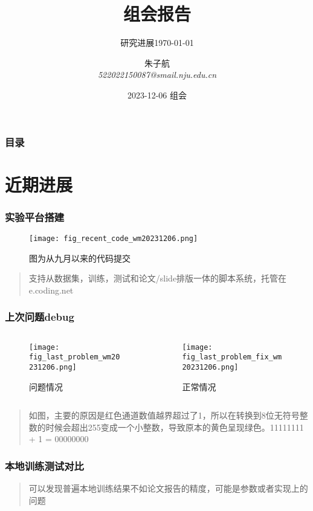 \documentclass{njupre/njupre}
\title[组会]{组会报告}
\subtitle{研究进展\today}
\author[朱子航]{\texorpdfstring{朱子航 \\ \smallskip \textit{522022150087@smail.nju.edu.cn}}{}}
\date[2023-12-06]{\texorpdfstring{2023-12-06 组会}{}}
\begin{document}
\begin{frame}
    \titlepage
\end{frame}
\begin{frame}
    \frametitle{目录}
    \tableofcontents
\end{frame}

\section{近期进展}

\begin{frame}
    \frametitle{实验平台搭建}
    \begin{figure}
        \texttt{[image: fig\_recent\_code\_wm20231206.png]}
        \caption{图为从九月以来的代码提交}
    \end{figure}
    \begin{quote}
        支持从数据集，训练，测试和论文/slide排版一体的脚本系统，托管在e.coding.net
    \end{quote}
\end{frame}

\begin{frame}
    \frametitle{上次问题debug}
    \begin{columns}[c]
        \begin{column}{0.5\textwidth}
            \begin{figure}
                \texttt{[image: fig\_last\_problem\_wm20231206.png]}
                \caption{问题情况}
            \end{figure}
        \end{column}
        \begin{column}{0.5\textwidth}
            \begin{figure}
                \texttt{[image: fig\_last\_problem\_fix\_wm20231206.png]}
                \caption{正常情况}
            \end{figure}
        \end{column}
    \end{columns}
    \begin{quote}
        如图，主要的原因是红色通道数值越界超过了1，所以在转换到8位无符号整数的时候会超出255变成一个小整数，导致原本的黄色呈现绿色。11111111 + 1 = 00000000
    \end{quote}
\end{frame}

\begin{frame}
    \frametitle{本地训练测试对比}
    \begin{table}
        \tiny 
        
    \end{table}
    \begin{table}
        \tiny
        
    \end{table} 
    \begin{quote}
        可以发现普遍本地训练结果不如论文报告的精度，可能是参数或者实现上的问题
    \end{quote}
\end{frame}
\end{document}
